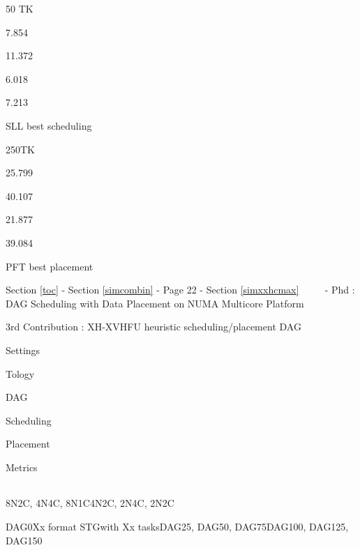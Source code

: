 \documentclass[11pt]{article}
\begin{document}
\textbar{}

50 TK

\textbar{}

7.854

\textbar{}

11.372

\textbar{}

6.018

\textbar{}

7.213

\textbar{}

SLL best scheduling

\textbar{} \textbar{}

250TK

\textbar{}

25.799

\textbar{}

40.107

\textbar{}

21.877

\textbar{}

39.084

\textbar{}

PFT best placement

\textbar{}

     {Section \ref{toc} - Section \ref{simcombin} - Page 22 -
Section \ref{simxxhcmax} ~~~~ - Phd : DAG Scheduling with Data Placement
on NUMA Multicore Platform}

3rd Contribution : XH-XVHFU heuristic scheduling/placement DAG

Settings

\textbar{}

Tology

\textbar{}

DAG

\textbar{}

Scheduling

\textbar{}

Placement

\textbar{}

Metrics

\begin{longtable}[]{@{}lllll@{}}
\toprule
\bottomrule
\end{longtable}

\textbar{}

8N2C, 4N4C, 8N1C4N2C, 2N4C, 2N2C

\textbar{}

DAG0Xx format STGwith Xx tasksDAG25, DAG50, DAG75DAG100, DAG125, DAG150
\end{document}

